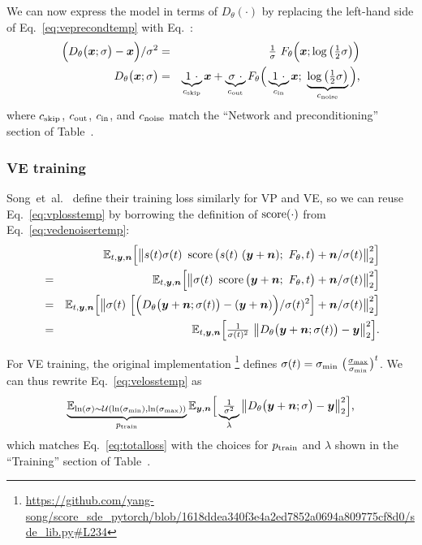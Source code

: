 We can now express the model in terms of $D_\theta(\cdot)$ by replacing the left-hand side of Eq.~\ref{eq:veprecondtemp} with Eq.~:
\begin{eqnarray}
  \Big( D_\theta \big( \boldsymbol{x}; \sigma \big) - \boldsymbol{x} \Big) / \sigma^2 &=& \tfrac{1}{\sigma} ~F_\theta\Big( \boldsymbol{x}; \log\big( \tfrac{1}{2} \sigma \big) \Big) \label{eq:vedenoisertemp} \\
  D_\theta \big( \boldsymbol{x}; \sigma \big) &=& \underbrace{1~\cdot}_{c_\text{skip}} \boldsymbol{x} + \underbrace{\sigma~\cdot}_{c_\text{out}} F_\theta\Big(\underbrace{1~\cdot}_{c_\text{in}} \boldsymbol{x}; ~\underbrace{\log \big( \tfrac{1}{2} \sigma \big)}_{c_\text{noise}} \Big)
  \label{eq:veprecond}
  \text{,}
\end{eqnarray}
where $c_\text{skip}$, $c_\text{out}$, $c_\text{in}$, and $c_\text{noise}$ match the ``Network and preconditioning'' section of Table~.

\subsubsection{VE training}

Song~et~al.~\cite{Song2021sde} define their training loss similarly for VP and VE, so we can reuse Eq.~\ref{eq:vplosstemp} by borrowing the definition of $\operatorname{score}(\cdot)$ from Eq.~\ref{eq:vedenoisertemp}:
\begin{eqnarray}
  && \mathbb{E}_{t, \boldsymbol{y}, \boldsymbol{n}} \Big[ \big\lVert s(t) \sigma(t) ~\operatorname{score}\big( s(t) ~(\boldsymbol{y} + \boldsymbol{n}); ~F_\theta, t \big) + \boldsymbol{n} / \sigma(t) \big\rVert^2_2 \Big] \\
  &=& \mathbb{E}_{t, \boldsymbol{y}, \boldsymbol{n}} \Big[ \big\lVert \sigma(t) ~\operatorname{score}\big( \boldsymbol{y} + \boldsymbol{n}; ~F_\theta, t \big) + \boldsymbol{n} / \sigma(t) \big\rVert^2_2 \Big] \\
  &=& \mathbb{E}_{t, \boldsymbol{y}, \boldsymbol{n}} \Big[ \big\lVert \sigma(t) ~\Big[ \Big( D_\theta \big( \boldsymbol{y} + \boldsymbol{n}; \sigma(t) \big) - (\boldsymbol{y} + \boldsymbol{n}) \Big) / \sigma(t)^2 \Big] + \boldsymbol{n} / \sigma(t) \big\rVert^2_2 \Big] \\
  &=& \mathbb{E}_{t, \boldsymbol{y}, \boldsymbol{n}} \Big[ \tfrac{1}{\sigma(t)^2} ~\big\lVert D_\theta \big( \boldsymbol{y} + \boldsymbol{n}; \sigma(t) \big) - \boldsymbol{y} \big\rVert^2_2 \Big]
  \label{eq:velosstemp}
  \text{.}
\end{eqnarray}

For VE training, the original implementation%
\footnote{\tiny\url{https://github.com/yang-song/score\_sde\_pytorch/blob/1618ddea340f3e4a2ed7852a0694a809775cf8d0/sde_lib.py\#L234}}
defines $\sigma(t) = \smin ~\big( \tfrac{\smax}{\smin} \big)^t$.
We can thus rewrite Eq.~\ref{eq:velosstemp} as
\begin{equation}
  \underbrace{\mathbb{E}_{\ln(\sigma) \sim \mathcal{U}( \ln(\smin), \ln(\smax))}}_{\ptrain} \mathbb{E}_{\signal, \noise} \Big[ \underbrace{\tfrac{1}{\sigma^2}}_{\lambda} \big\lVert D_\theta \big( \signal + \noise; \sigma \big) - \signal \big\rVert^2_2 \Big]
  \text{,}
\end{equation}
which matches Eq.~\ref{eq:totalloss} with the choices for $p_\text{train}$ and $\lambda$ shown in the ``Training'' section of Table~.


